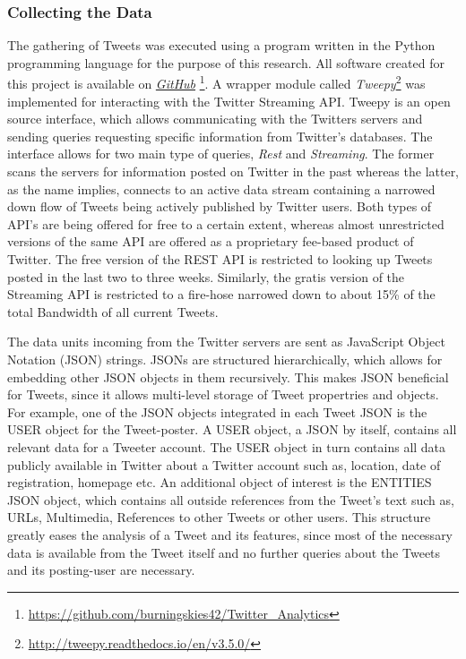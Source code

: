 		\subsubsection*{Collecting the Data}
		\label{sec:collect_data}
			The gathering of Tweets was executed using a program written in the Python programming language for the purpose of this research. All software created for this project is available on \href{https://github.com/burningskies42/Twitter_Analytics}{\textit{GitHub}} \footnote{\url{https://github.com/burningskies42/Twitter_Analytics}}. A wrapper module called \textit{Tweepy}\footnote{\url{http://tweepy.readthedocs.io/en/v3.5.0/}} was implemented for interacting with the Twitter Streaming API. Tweepy is an open source interface, which allows communicating with the Twitters servers and sending queries requesting specific information from Twitter's databases. The interface allows for two main type of queries, \textit{Rest} and \textit{Streaming}. The former scans the servers for information posted on Twitter in the past whereas the latter, as the name implies, connects to an active data stream containing a narrowed down flow of Tweets being actively published by Twitter users. Both types of API's are being offered for free to a certain extent, whereas almost unrestricted versions of the same API are offered as a proprietary fee-based product of Twitter. The free version of the REST API is restricted to looking up Tweets posted in the last two to three weeks. Similarly, the gratis version of the Streaming API is restricted to a fire-hose narrowed down to about 15\% of the total Bandwidth of all current Tweets.
			
			\par
			
			The data units incoming from the Twitter servers are sent as JavaScript Object Notation (JSON) strings. JSONs are structured hierarchically, which allows for embedding other JSON objects in them recursively. This makes JSON beneficial for Tweets, since it allows multi-level storage of Tweet propertries and objects. For example, one of the JSON objects integrated in each Tweet JSON is the USER object for the Tweet-poster. A USER object, a JSON by itself, contains all relevant data for a Tweeter account. The USER object in turn contains all data publicly available in Twitter about a Twitter account such as, location, date of registration, homepage etc. An additional object of interest is the ENTITIES JSON object, which contains all outside references from the Tweet's text such as, URLs, Multimedia, References to other Tweets or other users. 
			This structure greatly eases the analysis of a Tweet and its features, since most of the necessary data is available from the Tweet itself and no further queries about the Tweets and its posting-user are necessary.
			\par
		
